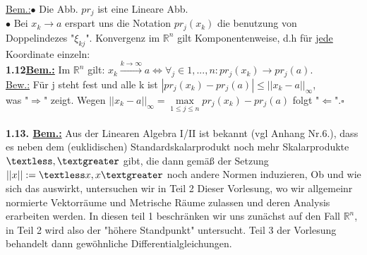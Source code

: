 \documentclass[11pt]{article}
\begin{document}
	\underline{Bem.:}$\bullet$ Die Abb. $pr_j$ ist eine Lineare Abb.\\
	$\bullet$ Bei $x_k\rightarrow a$ erspart uns die Notation $pr_j (x_k)$ die 
	benutzung von Doppelindezes "$\xi_{kj}$". Konvergenz im $\mathbb{R}^n$ gilt 
	Komponentenweise, d.h für \underline{jede} Koordinate einzeln:\\
	\textbf{1.12\underline{Bem.:}} Im $\mathbb{R}^n$ gilt: 
	\ul{$x_k 
	\xrightarrow{k\rightarrow \infty} a \Leftrightarrow \forall_j \in 
	{1,...,n}: pr_j(x_k)\rightarrow pr_j(a)$}.\\
	\underline{Bew.:} Für j steht fest und alle k ist $|pr_j(x_k) - pr_j(a)| 
	\leq ||x_k-a||_\infty$,\\
	was "$\Rightarrow$" zeigt. Wegen $||x_k-a||_\infty = \underset{1\leq j \leq 
	n}{\max}{pr_j (x_k)-pr_j(a)}$ folgt "$\Leftarrow$".\hfill$\square$\\
	\\
	\textbf{1.13. \underline{Bem.:}} Aus der Linearen Algebra I/II ist bekannt 
	(vgl Anhang Nr.6.), dass es neben dem (euklidischen) Standardskalarprodukt 
	noch mehr Skalarprodukte $\textless,\textgreater$ gibt, die dann gemäß der 
	Setzung $||x||:=\textless x,x\textgreater$ noch andere Normen induzieren, 
	Ob und wie sich das auswirkt, untersuchen wir in Teil 2 Dieser Vorlesung, 
	wo wir allgemeinr normierte Vektorräume und Metrische Räume zulassen und 
	deren Analysis erarbeiten werden. In diesen teil 1 beschränken wir uns 
	zunächst auf den Fall $\mathbb{R}^n$, in Teil 2 wird also der "höhere 
	Standpunkt" untersucht. Teil 3 der Vorlesung behandelt dann gewöhnliche 
	Differentialgleichungen.
\end{document}
